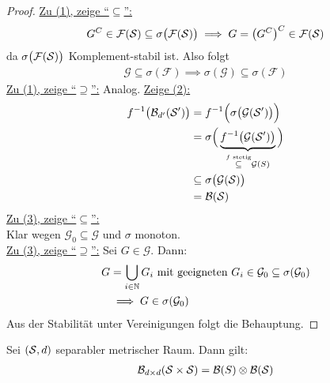 \begin{proof}\enter
	\underline{Zu (1), zeige ``$\subseteq$'':}
	\begin{align*}
		G^C\in\mathcal{F}(\S)\subseteq\sigma\big(\mathcal{F}(\S)\big)
		\implies
		G=\big(G^C\big)^C\in\mathcal{F}(\S)
	\end{align*}
	da $\sigma\big(\mathcal{F}(\S)\big)$ Komplement-stabil ist. Also folgt
	\begin{align*}
		\mathcal{G}\subseteq\sigma(\mathcal{F})
		\implies\sigma(\mathcal{G})\subseteq\sigma(\mathcal{F})
	\end{align*}
	\underline{Zu (1), zeige ``$\supseteq$'':} Analog.\nl
	\underline{Zeige (2):}
	\begin{align*}
		f^{-1}\big(\B_{d'}(\S')\big)&=f^{-1}\Big(\sigma\big(\mathcal{G}(\S')\big)\Big)\\
		&=\sigma\Big(\underbrace{f^{-1}\big(\mathcal{G}(\S')\big)}_{\stackrel{f\text{ stetig}}{\subseteq}\mathcal{G}(S)}\Big)\\
		&\subseteq\sigma\big(\mathcal{G}(\S)\big)\\
		&=\B(\S)
	\end{align*}
	\underline{Zu (3), zeige ``$\subseteq$'':}\\
	Klar wegen $\mathcal{G}_0\subseteq\mathcal{G}$ und $\sigma$ monoton.\\
	\underline{Zu (3), zeige ``$\supseteq$'':} Sei $G\in\mathcal{G}$. Dann:
	\begin{align*}
		G&=\bigcup\limits_{i\in\N} G_i\mit\text{geeigneten }G_i\in\mathcal{G}_0\subseteq\sigma(\mathcal{G}_0)\\
		&\implies
		G\in\sigma(\mathcal{G}_0)
	\end{align*}
	Aus der Stabilität unter Vereinigungen folgt die Behauptung.
\end{proof}

\begin{satz}\label{satz3.3} %
	Sei $(\S,d)$ separabler metrischer Raum. Dann gilt:
	\begin{align*}
		\B_{d\times d}(\S\times\S)=\B(S)\otimes\B(\S)
	\end{align*}
\end{satz}

